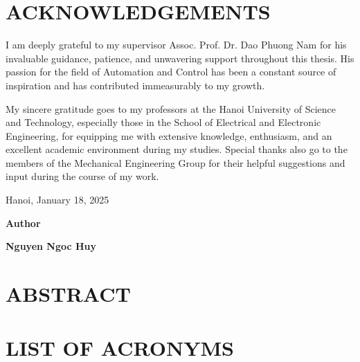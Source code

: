 \documentclass{article}
\begin{document}
    \cleardoublepage{}
    \thispagestyle{empty}
    \mbox{}

    \cleardoublepage
    
    \section*{ACKNOWLEDGEMENTS}
    \thispagestyle{empty}
    I am deeply grateful to my supervisor Assoc. Prof. Dr. Dao Phuong Nam for his invaluable guidance,  patience, and unwavering support throughout this thesis.
    His passion for the field of Automation and Control has been a constant source of inspiration and has contributed immeasurably to my growth.
    
    My sincere gratitude goes to my professors at the Hanoi University of Science and Technology, especially those in the School of Electrical and Electronic Engineering, for equipping me with extensive knowledge, enthusiasm, and an excellent academic environment during my studies. Special thanks also go to the members of the Mechanical Engineering Group for their helpful suggestions and input during the course of my work.


    \vspace{4cm}
    \hspace{8cm} Hanoi, January 18, 2025

    \hspace{10cm}\textbf{Author}

    \vspace{2cm}
    \hspace{9cm}\textbf{Nguyen Ngoc Huy}
    

    \cleardoublepage
    \thispagestyle{empty}
    \mbox{}

    
    
    \cleardoublepage
    \thispagestyle{empty}
    \section*{ABSTRACT}
    


    \cleardoublepage
    \thispagestyle{empty}
    \mbox{}


    \cleardoublepage

    {\protect\thispagestyle{empty}}
    \tableofcontents
    \thispagestyle{empty}
    \cleardoublepage

    \section*{LIST OF ACRONYMS}
\end{document}
